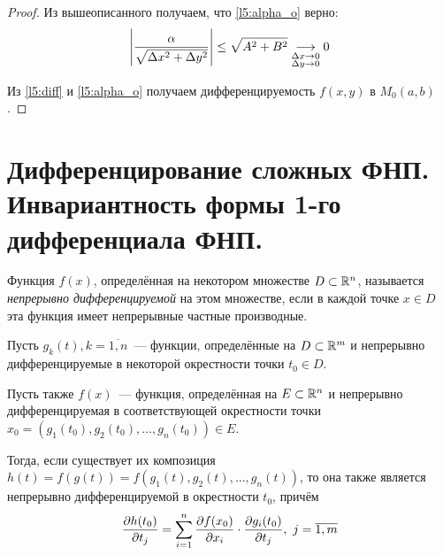\documentclass[../../main.tex]{subfiles}
\begin{document}
\begin{proof}
Из вышеописанного получаем, что \eqref{l5:alpha_o} верно:
\[\left|{\frac{\alpha}{\sqrt{\Delta x^2 + \Delta y^2}}}\right| \leq
\sqrt{A^2+B^2} \underset{\substack{\Delta x\to 0 \\
\Delta y \to 0}}\longrightarrow 0\]

Из \eqref{l5:diff} и \eqref{l5:alpha_o} получаем дифференцируемость
$f(x,y)$ в $M_0(a,b)$.
\end{proof}

\section{Дифференцирование сложных ФНП. Инвариантность формы 1-го
дифференциала ФНП.}
\begin{defn}
Функция $f(x)$, определённая на некотором множестве $D\subset\mathbb{R}^n$,
называется \emph{непрерывно дифференцируемой} на этом множестве, если в каждой 
точке $x\in D$ эта функция имеет непрерывные частные производные.
\end{defn}
\begin{thm}
Пусть $g_k(t),k=\overline{1,n}$~--- функции, определённые на 
$D\subset\mathbb{R}^m$ и непрерывно дифференцируемые в некоторой окрестности 
точки $t_0\in D$.

Пусть также $f(x)$~--- функция, определённая на $E\subset\mathbb{R}^n$ и
непрерывно дифференцируемая в соответствующей окрестности точки $x_0 = 
(g_1(t_0),g_2(t_0),\dots,g_n(t_0))\in E$.

Тогда, если существует их композиция $h(t) = f(g(t)) =
f(g_1(t),g_2(t),\dots,g_n(t))$, то она также является непрерывно 
дифференцируемой в окрестности $t_0$, причём
\[\frac{\partial h(t_0)}{\partial t_j}=\sum_{i=1}^{n}
\frac{\partial f(x_0)}{\partial x_i}\cdot
\frac{\partial g_i(t_0)}{\partial t_j},\ j=\overline{1,m}\]
\end{thm}
\end{document}
